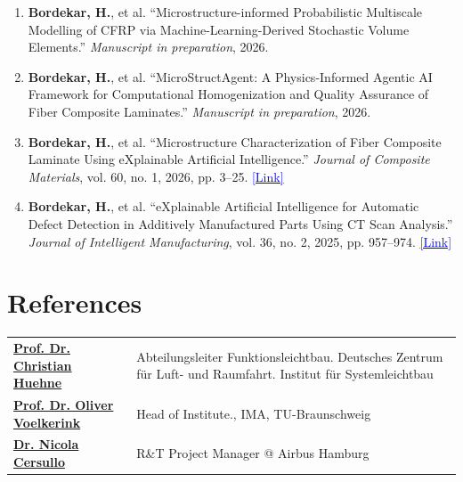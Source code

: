 \documentclass[a4paper,20pt]{article}
\begin{document}
\begin{enumerate}

  \item \textbf{Bordekar, H.}, et al.
  ``Microstructure-informed Probabilistic Multiscale Modelling of CFRP via Machine-Learning-Derived Stochastic Volume Elements.''
  \textit{Manuscript in preparation}, 2026.

  \item \textbf{Bordekar, H.}, et al.
  ``MicroStructAgent: A Physics-Informed Agentic AI Framework for Computational Homogenization and Quality Assurance of Fiber Composite Laminates.''
  \textit{Manuscript in preparation}, 2026.

  \item \textbf{Bordekar, H.}, et al.
  ``Microstructure Characterization of Fiber Composite Laminate Using eXplainable Artificial Intelligence.''
  \textit{Journal of Composite Materials}, vol. 60, no. 1, 2026, pp. 3--25.
  \href{https://journals.sagepub.com/doi/pdf/10.1177/00219983251345559}{\textcolor{blue}{[Link]}}

  \item \textbf{Bordekar, H.}, et al.
  ``eXplainable Artificial Intelligence for Automatic Defect Detection in Additively Manufactured Parts Using CT Scan Analysis.''
  \textit{Journal of Intelligent Manufacturing}, vol. 36, no. 2, 2025, pp. 957--974.
  \href{https://link.springer.com/article/10.1007/s10845-023-02272-4}{\textcolor{blue}{[Link]}}

\end{enumerate}
\vspace{2pt}

\section{\color{blue}References}

\begin{tabular}{@{} p{6cm} p{10cm}@{}}
\textbf{\href{https://www.dlr.de/de/sy/ueber-uns/abteilungen-dlr-sy/dlr-sy-funktionsleichtbau}{Prof. Dr. Christian Huehne}} & Abteilungsleiter Funktionsleichtbau. Deutsches Zentrum für Luft- und Raumfahrt. Institut für Systemleichtbau \\
\textbf{\href{https://www.tu-braunschweig.de/ima/team/head-of-institute/prof-dr-ing-oliver-voelkerink}{Prof. Dr. Oliver Voelkerink}} & Head of Institute., IMA, TU-Braunschweig\\
\textbf{\href{https://www.linkedin.com/in/nicola-cersullo-41772b131 }{
Dr. Nicola Cersullo}} & R\&T Project Manager @ Airbus Hamburg \\
\end{tabular}
\end{document}
